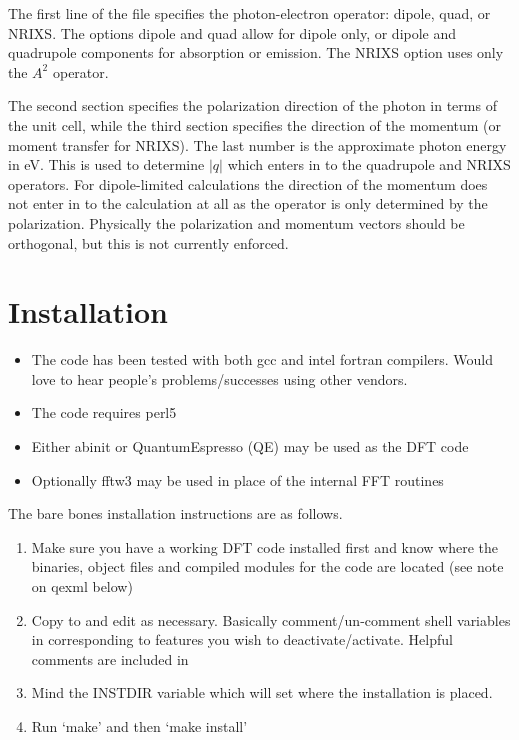\documentclass[11pt]{report}
\begin{document}
The first line of the  file specifies the photon-electron operator: dipole, quad, or NRIXS. The options dipole 
and quad allow for dipole only, or dipole and quadrupole components for absorption or emission. The NRIXS option uses only the $A^2$ 
operator. 

The second section specifies the polarization direction of the photon in terms of the unit cell, while the third section specifies the 
direction of the momentum (or moment transfer for NRIXS). The last number is the approximate photon energy in eV. This is used 
to determine $\vert q \vert$ which enters in to the quadrupole and NRIXS operators. For dipole-limited calculations the direction of the 
momentum does not enter in to the calculation at all as the operator is only determined by the polarization. 
Physically the polarization and momentum vectors should be orthogonal, but this is not currently enforced. 
\fi

\appendix
\chapter{Installation}
\begin{itemize}
\item The code has been tested with both gcc and intel fortran compilers. Would love to hear people's problems/successes using other vendors. 
\item The code requires perl5
\item Either {\sc abinit} or {\sc QuantumEspresso} (QE) may be used as the DFT code
\item Optionally {\sc fftw3} may be used in place of the internal FFT routines
\end{itemize}

The bare bones installation instructions are as follows.

\begin{enumerate}
\item{ Make sure you have a working DFT code installed first and know where the binaries, object files and compiled modules for the code are located (see note on qexml below)}
\item{ Copy  to  and edit as necessary. Basically comment/un-comment shell variables 
in  corresponding to features you wish to deactivate/activate. Helpful comments are included in  }
\item{ Mind the INSTDIR variable which will set where the installation is placed. }
\item{ Run `make' and then `make install'}
\end{enumerate}
\end{document}
